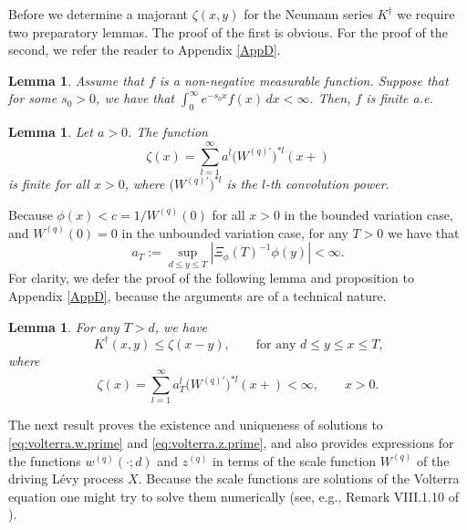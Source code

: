 \documentclass[12pt,reqno]{amsart}
\newcommand{\blue}{\textcolor[rgb]{0.00,0.00,1.00}}
\newcommand{\green}{\textcolor[rgb]{0.00,0.70,.30}}
\newtheorem{lemma}[theorem]{Lemma}
\theoremstyle{definition}
\theoremstyle{remark}
\begin{document}

  



\bigskip

Before we determine a majorant $\zeta(x,y)$ for the Neumann series $K^{\dagger}$
we require two preparatory lemmas. The proof of the first is obvious. For the proof of the second, we refer the reader to Appendix \ref{AppD}.


\begin{lemma}\label{lem:prep1}
Assume that $f$ is a non-negative measurable function. Suppose that for
some $s_0{>0}$, we have that $\int_0^\infty e^{-s_0x}f(x)\,dx<\infty$. Then, $f$ is finite a.e.
\end{lemma}
\begin{lemma}\label{lem:zeta.finite}
Let $a>0$. The function 
\begin{equation}\label{eq:zeta}
\zeta(x)=\sum_{l=1}^\infty a^l{{(W^{(q)\prime}}})^{*l}(x+)
\end{equation}
is finite for all $x>0$, where ${{(W^{(q)\prime}}})^{*l}$ is the $l$-th convolution power.
\end{lemma}


Because $\phi(x)<c = 1/W^{(q)}(0)$ for all $x >0$ in the bounded variation case, and $W^{(q)}(0)=0$ in the unbounded variation case, for any $T>0$ we have that
\begin{equation}\label{eq:def_a} a_T:=\sup_{d\le y\le {T}}\left|\Xi_{\phi}(T)^{-1}\phi(y)\right|<\infty.
\end{equation}
For clarity, we defer the proof of the following lemma and proposition to Appendix \ref{AppD}, because the arguments are of a technical nature.
\begin{lemma}\label{lem:i-iii}
For any $T>d$, we have 
\[
K^{\dagger}(x,y)\le \zeta(x-y),\qquad\text{for any $d \leq y\leq x\leq T$,}
\]
where
\[
\zeta(x)=\sum_{l=1}^\infty a_T^l{{(W^{(q)\prime}}})^{*l}(x+)<\infty,\qquad\text{$x > 0$.}
\]
\end{lemma}
The next result proves the existence and uniqueness of solutions to \eqref{eq:volterra.w.prime} and \eqref{eq:volterra.z.prime}, 
and also provides expressions for the functions $w^{(q)}(\cdot;d)$ and $z^{(q)}$ in terms of the scale function $W^{(q)}$ 
of the driving L\'evy process $X$. Because the scale functions are solutions of the Volterra equation one might try to solve them 
numerically (see, e.g., Remark VIII.1.10 of \cite{asmussen_albrecher_2010}).
\end{document}
